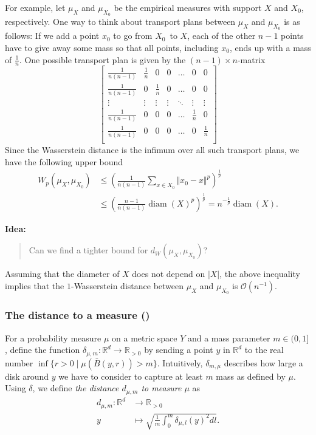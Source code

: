 \documentclass[10pt,a4paper]{article}
\theoremstyle{definition}
\newcommand{\R}{\mathbb{R}}
\newenvironment{idea}{%
	\begin{tcolorbox}[colback=green, breakable, sharp corners]
		\textbf{Idea: }
		\medskip
		\begin{quote}
			\centering
}{\end{quote}\medskip\end{tcolorbox}}
\begin{document}
For example, let $\mu_X$ and $\mu_{X_0}$ be the empirical measures with support $X$ and $X_0$, respectively. One way to think about transport plans between $\mu_X$ and $\mu_{X_0}$ is as follows: If we add a point $x_0$ to go from $X_0$ to $X$, each of the other $n-1$ points have to give away some mass so that all points, including $x_0$, ends up with a mass of $\frac{1}{n}$. One possible transport plan is given by the $(n-1)\times n$-matrix
$$
	\begin{bmatrix} 
	\frac{1}{n(n-1)} & \frac{1}{n} & 0 & 0 & \dots  & 0 & 0\\
	\frac{1}{n(n-1)} & 0 & \frac{1}{n} & 0 & \dots  & 0 & 0\\
	\vdots & \vdots & \vdots & \vdots & \ddots & \vdots & \vdots \\
	\frac{1}{n(n-1)} & 0 & 0 & 0 & \hdots & \frac{1}{n}  & 0 \\
	\frac{1}{n(n-1)} & 0 & 0 & 0 & \hdots & 0 & \frac{1}{n}  \\
	\end{bmatrix}
$$
Since the Wasserstein distance is the infimum over all such transport plans, we have the following upper bound
\begin{align*}
W_p(\mu_X, \mu_{X_0})&\leq \left(\frac{1}{n(n-1)}\sum_{x\in X_0}\Vert x_0-x\Vert^p\right)^{\frac{1}{p}} \\&\leq\left(\frac{n-1}{n(n-1)}\operatorname{diam}(X)^p\right)^{\frac{1}{p}} = n^{-\frac{1}{p}} \operatorname{diam}(X).
\end{align*}

\begin{idea}
	Can we find a tighter bound for $d_W(\mu_X, \mu_{X_0})$?
\end{idea}

Assuming that the diameter of $X$ does not depend on $|X|$, the above inequality implies that the $1$-Wasserstein distance between $\mu_X$ and $\mu_{X_0}$ is $\mathcal{O}(n^{-1})$.


\subsubsection{The distance to a measure (\autocite{Buchet2013})}
For a probability measure $\mu$ on a metric space $Y$ and a mass parameter $m\in(0,1]$, define the function $\delta_{\mu, m}\colon\R^d\to\R_{>0}$ by sending a point $y$ in $\R^d$ to the real number $\inf\{r>0\mid\mu(\bar{B}(y,r))>m\}$. Intuitively, $\delta_{m,\mu}$ describes how large a disk around $y$ we have to consider to capture at least $m$ mass as defined by $\mu$. Using $\delta$, we define \textit{the distance $d_{\mu,m}$ to measure $\mu$} as
\begin{align*}
	d_{\mu,m}\colon\R^d&\to\R_{>0}\\
	y&\mapsto\sqrt{\frac{1}{m}\int_0^m\delta_{\mu,l}(y)^2 dl}.
\end{align*}
\end{document}
